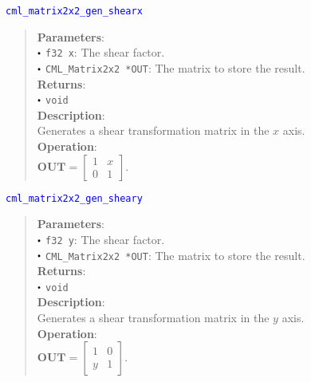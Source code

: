 \documentclass[a4paper,oneside,8pt]{extarticle}
\newcommand{\function}[1]{
  \noindent\textcolor{blue}{\texttt{#1}}
  \vspace{-0.3em}
}
\renewcommand{\dot}{\raisebox{0.3ex}{\scalebox{0.6}{$\bullet$}}}
\theoremstyle{definition}
\begin{document}
\function{cml\_matrix2x2\_gen\_shearx}
\begin{quote}
  \textbf{Parameters}: \\
  $\dot$ \texttt{f32 x}: The shear factor. \\
  $\dot$ \texttt{CML\_Matrix2x2 *OUT}: The matrix to store the result. \\
  \textbf{Returns}: \\
  $\dot$ \texttt{void} \\

  \vspace{-0.75em}
  \textbf{Description}: \\
  Generates a shear transformation matrix in the $x$ axis. \\

  \vspace{-0.75em}
  \textbf{Operation}: \\
  $\mathbf{OUT} = \begin{bmatrix}
  1 & x \\
  0 & 1
  \end{bmatrix}$. \\
\end{quote}

\function{cml\_matrix2x2\_gen\_sheary}
\begin{quote}
  \textbf{Parameters}: \\
  $\dot$ \texttt{f32 y}: The shear factor. \\
  $\dot$ \texttt{CML\_Matrix2x2 *OUT}: The matrix to store the result. \\
  \textbf{Returns}: \\
  $\dot$ \texttt{void} \\

  \vspace{-0.75em}
  \textbf{Description}: \\
  Generates a shear transformation matrix in the $y$ axis. \\

  \vspace{-0.75em}
  \textbf{Operation}: \\
  $\mathbf{OUT} = \begin{bmatrix}
  1 & 0 \\
  y & 1
  \end{bmatrix}$. \\
\end{quote}
\end{document}
